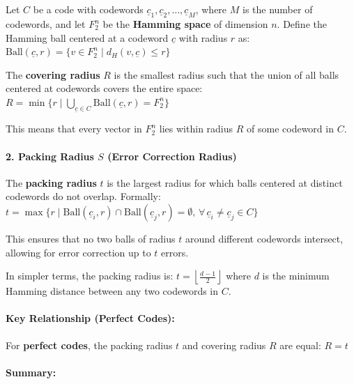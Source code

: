 \documentclass[11pt]{article}
\begin{document}
Let \(C\) be a code with codewords
\(\underline{c}_1, \underline{c}_2, \dots, \underline{c}_M\), where
\(M\) is the number of codewords, and let \(F_2^n\) be the
\textbf{Hamming space} of dimension \(n\). Define the Hamming ball
centered at a codeword \(\underline{c}\) with radius \(r\) as:
\(\text{Ball}(\underline{c}, r) = \{ v \in F_2^n \mid d_H(v, \underline{c}) \leq r \}\)

The \textbf{covering radius} \(R\) is the smallest radius such that the
union of all balls centered at codewords covers the entire space:
\(R = \min \{ r \mid \bigcup_{\underline{c} \in C} \text{Ball}(\underline{c}, r) = F_2^n \}\)

This means that every vector in \(F_2^n\) lies within radius \(R\) of
some codeword in \(C\).

\paragraph{\texorpdfstring{\textbf{2. Packing Radius \(S\) (Error
Correction
Radius)}}{2. Packing Radius S (Error Correction Radius)}}\label{packing-radius-s-error-correction-radius}

The \textbf{packing radius} \(t\) is the largest radius for which balls
centered at distinct codewords do not overlap. Formally:
\(t = \max \{ r \mid \text{Ball}(\underline{c}_i, r) \cap \text{Ball}(\underline{c}_j, r) = \emptyset, \, \forall \, \underline{c}_i \neq \underline{c}_j \in C \}\)

This ensures that no two balls of radius \(t\) around different
codewords intersect, allowing for error correction up to \(t\) errors.

In simpler terms, the packing radius is:
\(t = \left\lfloor \frac{d - 1}{2} \right\rfloor\) where \(d\) is the
minimum Hamming distance between any two codewords in \(C\).

\paragraph{\texorpdfstring{\textbf{Key Relationship (Perfect
Codes):}}{Key Relationship (Perfect Codes):}}\label{key-relationship-perfect-codes}

For \textbf{perfect codes}, the packing radius \(t\) and covering radius
\(R\) are equal: \(R = t\)

\paragraph{\texorpdfstring{\textbf{Summary:}}{Summary:}}\label{summary}
\end{document}
